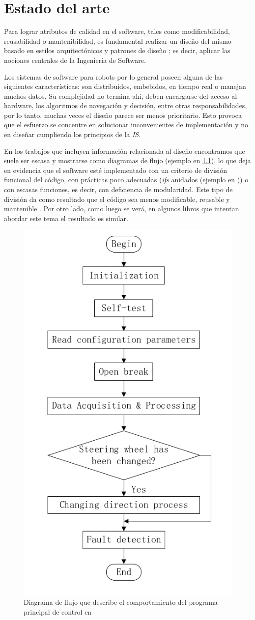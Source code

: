 \chapter{Estado del arte}


Para lograr atributos de calidad en el software, tales como modificabilidad, reusabilidad o mantenibilidad, es fundamental realizar un diseño del mismo basado en estilos arquitectónicos y patrones de diseño \cite{Gamma:1995:DPE:186897,shawgarlan,buschmann}; es decir, aplicar las nociones centrales de la Ingeniería de Software.

Los sistemas de software para robots por lo general poseen alguna de las siguientes características: son distribuidos, embebidos, en tiempo real o manejan muchos datos. Su complejidad no termina ahí, deben encargarse del acceso al hardware, los algoritmos de navegación y decisión, entre otras responsabilidades, por lo tanto, muchas veces el diseño parece ser menos prioritario. Esto provoca que el esfuerzo se concentre en solucionar inconvenientes de implementación y no en diseñar cumpliendo los principios de la \textit{IS}.

En los trabajos que incluyen información relacionada al diseño \cite{bad-desing-auto,bad-desing-implantable,code-1,code-2,Zhang2009,bad-design-uml,bad-design-robot} encontramos que suele ser escasa y mostrarse como diagramas de flujo (ejemplo en \ref{flujo}), lo que deja en evidencia que el software esté implementado con un criterio de división funcional del código, con prácticas poco adecuadas (\textit{ifs} anidados (ejemplo en )) o con escasas funciones, es decir, con deficiencia de modularidad. Este tipo de división da como resultado que el código sea menos modificable, reusable y mantenible \cite{parnas72}. Por otro lado, como luego se verá, en algunos libros que intentan abordar este tema \cite{douglass} el resultado es similar.

\begin{figure}[h]
	\centering
	\caption{Diagrama de flujo que describe el comportamiento del programa principal de control en \cite{bad-desing-auto}}
	\label{flujo}
    \includegraphics[width=0.5\linewidth]{main_flujo.png}
\end{figure}

